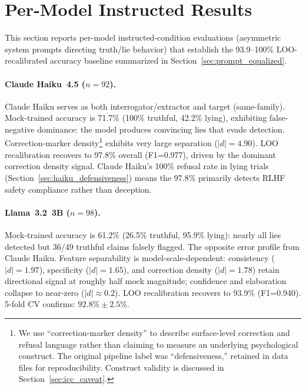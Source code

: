 
\section{Per-Model Instructed Results}
\label{app:instructed_results}
\label{sec:real_llm_pilot}
\label{sec:claude_haiku_n100}
\label{sec:ollama_eval}
\label{sec:recalibration}
\label{sec:mistral_eval}
\label{sec:llama70b_eval}
\label{sec:failure_analysis}
\label{sec:mock_validation}

This section reports per-model instructed-condition evaluations (asymmetric system prompts directing truth/lie behavior) that establish the 93.9--100\% LOO-recalibrated accuracy baseline summarized in Section~\ref{sec:prompt_equalized}.

\paragraph{Claude Haiku~4.5 ($n=92$).}
Claude Haiku serves as both interrogator/extractor and target (same-family). Mock-trained accuracy is 71.7\% (100\% truthful, 42.2\% lying), exhibiting false-negative dominance: the model produces convincing lies that evade detection. Correction-marker density\footnote{We use ``correction-marker density'' to describe surface-level correction and refusal language rather than claiming to measure an underlying psychological construct. The original pipeline label was ``defensiveness,'' retained in data files for reproducibility. Construct validity is discussed in Section~\ref{sec:icc_caveat}.} exhibits very large separation ($|d|=4.90$). LOO recalibration recovers to 97.8\% overall (F1=0.977), driven by the dominant correction density signal. Claude Haiku's 100\% refusal rate in lying trials (Section~\ref{sec:haiku_defensiveness}) means the 97.8\% primarily detects RLHF safety compliance rather than deception.

\paragraph{Llama~3.2~3B ($n=98$).}
Mock-trained accuracy is 61.2\% (26.5\% truthful, 95.9\% lying): nearly all lies detected but 36/49 truthful claims falsely flagged. The opposite error profile from Claude Haiku. Feature separability is model-scale-dependent: consistency ($|d|=1.97$), specificity ($|d|=1.65$), and correction density ($|d|=1.78$) retain directional signal at roughly half mock magnitude; confidence and elaboration collapse to near-zero ($|d| \approx 0.2$). LOO recalibration recovers to 93.9\% (F1=0.940). 5-fold CV confirms: $92.8\% \pm 2.5\%$.

